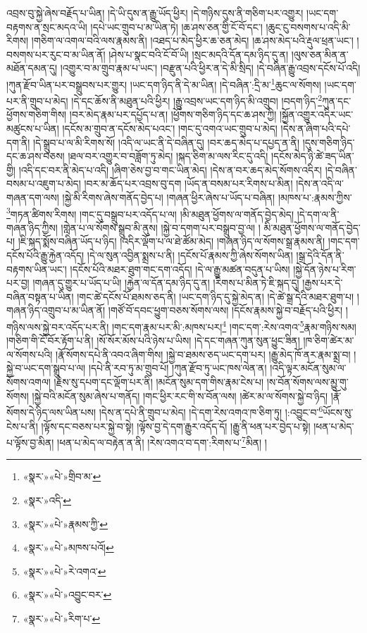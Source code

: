 འབྲས་བུ་སྐྱེ་ཞེས་བརྗོད་པ་ཡིན། །དེ་ཡི་དུས་ན་རྒྱུ་ཡོད་ཕྱིར། །དེ་གཉིས་དུས་ནི་གཅིག་པར་འགྱུར། །ཡང་དག་བརྟགས་ན་སྲང་མདའ་ཡི། །དཔེ་ཡང་གྲུབ་པ་མ་ཡིན་ཏེ། །ཆ་ཤས་ཅན་གྱི་ངོ་བོ་དང་། །ཆུང་ངུ་བསགས་པ་འདི་མི་རིགས། །གཅིག་ལ་འགལ་བའི་ལས་རྣམས་ནི། །འཐད་པ་མེད་ཕྱིར་ཆ་ཅན་མེད། །ཆ་ཤས་མེད་པའི་རྡུལ་ཕྲན་ཡང་། །བསགས་པར་རུང་བ་མ་ཡིན་ནོ། །ཤེས་པ་སྣང་བའི་ངོ་བོ་ཡི། །སྲང་མདའི་དོན་དམ་ཉིད་དུ་ན། །ལུས་ཅན་མིན་ན་མཐོན་དམན་དུ། །འགྱུར་བ་མ་གྲུབ་རྣམ་པ་ཡང་། །བརྫུན་པའི་ཕྱིར་ན་དེ་མི་སྲིད། །དེ་བཞིན་རྒྱུ་འབྲས་དངོས་པོ་འདི། །ཀུན་རྫོབ་ཡིན་པར་བསྒྲུབས་པར་གྱུར། །ཡང་དག་ཉིད་ནི་དེ་མ་ཡིན། །དེ་བཞིན་:དྲི་མ་\footnote{«སྣར་»«པེ་»གྲིབ་མ་}ཆུང་ལ་སོགས། །ཡང་དག་པར་ནི་གྲུབ་པ་མེད། །དེ་དང་ཆོས་ནི་མཐུན་པའི་ཕྱིར། །རྒྱུ་འབྲས་ཡང་དག་ཉིད་མི་འགྲུབ། །བདག་ཉིད་\footnote{«སྣར་»འདི་}ཀུན་དང་ཕྱོགས་གཅིག་གིས། །བར་མེད་རྣམ་པར་དཔྱོད་པ་ན། །ཕྱོགས་གཅིག་ཉིད་དང་ཆ་ཤས་ཀྱི། །སྐྱོན་འགྱུར་འདིར་ཡང་མཚུངས་པ་ཡིན། །དངོས་མ་གྲུབ་ན་དངོས་མེད་པའང་། །གང་དུ་འགའ་ཡང་གྲུབ་པ་མེད། །དེས་ན་ཞིག་པའི་དཔེ་དག་ནི། །དེ་སྒྲུབ་པ་ལ་མི་རིགས་སོ། །འདི་ལ་ཡང་ནི་དེ་བཞིན་དུ། །བར་ཆད་མེད་པ་དཔྱད་ན་ནི། །དུས་གཅིག་ཉིད་དང་ཆ་ཤས་བཅས། །ཐལ་བར་འགྱུར་བ་བཟློག་ཏུ་མེད། །སྐད་ཅིག་མ་ལས་རིང་དུ་འདི། །དངོས་མེད་ཉི་ཚེ་ཟད་ཡིན་གྱི། །འདི་དང་བར་ནི་མེད་པ་འདི། །ཞིག་ཅེས་བྱ་བ་གང་ཡིན་མེད། །དེས་ན་བར་ཆད་མེད་སོགས་འདིར། །དེ་བཞིན་བསམ་པ་འཇུག་པ་མེད། །བར་མ་ཆོད་པར་འབྲས་བུ་དག །ཡོད་ན་བསམ་པར་རིགས་པ་མིན། །དེས་ན་འདི་ལ་གཞན་དག་ལས། །སྐྱེ་མི་རིགས་ཞེས་གནོད་བྱེད་པ། །གཞན་ཕྱིར་ཞེས་པ་ཡོད་པ་བཞིན། །མཁས་པ་:རྣམས་ཀྱིས་\footnote{«སྣར་»«པེ་»རྣམས་ཀྱི་}གཏན་ཚིགས་རིགས། །གང་དུ་བསྒྲུབ་པར་འདོད་པ་ལ། །མི་མཐུན་ཕྱོགས་ལ་གནོད་བྱེད་མེད། །དེ་དག་ལ་ནི་གཞན་ཉིད་ཀྱིས། །གླེན་པ་ལ་སོགས་སྒྲུབ་མི་ནུས། །སྐྱེ་བ་དགག་པར་བསྒྲུབ་བྱ་ལ། །
མི་མཐུན་ཕྱོགས་ལ་གནོད་བྱེད་པ། །ཇི་སྐད་སྨོས་བཞིན་ཡོད་པ་ཉིད། །འདིར་ལྡོག་པ་ལ་ཐེ་ཚོམ་མེད། །གཞན་ཉིད་ལ་སོགས་སྒྲ་རྣམས་ནི། །གང་དག་དངོས་པོའི་རྒྱུ་རྐྱེན་འདོད། །དེ་ལ་སུན་འབྱིན་སྨྲས་པ་ནི། །དངོས་པོ་རྣམས་ཀྱི་ཞེས་སོགས་ཡིན། །སྒྲ་དེའི་དོན་ནི་བརྟགས་ཡིན་ཡང་། །དངོས་པོའི་མཐར་ཐུག་གང་དག་འདོད། །དེ་ལ་རྒྱུ་མཚན་བདུན་པ་ཡིས། །སྐྱེ་དོན་ཉེས་པ་རིག་པར་བྱ། །གཞན་དུ་གྱུར་པ་ཡོད་པ་ཡི། །རྐྱེན་ལ་དོན་དམ་ཉིད་དུ་ན། །རིགས་པ་མིན་ཏེ་ཇི་སྐད་དུ། །རྒྱས་པར་དེ་བཞིན་བསྟན་པ་ཡིན། །གང་ཚེ་དངོས་པོ་ཐམས་ཅད་ནི། །ཡང་དག་ཉིད་དུ་སྐྱེ་མེད་ན། །དེ་ཚེ་སྒྲ་དེའི་མཐར་ཐུག་པ། །གཞན་ཉིད་འགྲུབ་པ་མ་ཡིན་ནོ། །གཙོ་བོ་དབང་ཕྱུག་བཅས་སོགས་ལས། །དངོས་རྣམས་སྐྱེ་བ་བརྗོད་པའི་ཕྱིར། །གཉིས་ལས་སྐྱེ་བར་འདོད་པར་ནི། །གང་དག་རྣམ་པར་མི་:མཁས་པར།\footnote{«སྣར་»«པེ་»མཁས་པའོ།} །གང་དག་:རེས་འགའ་\footnote{«སྣར་»«པེ་»རེ་འགའ་}རྣམ་གཉིས་སམ། །གཅིག་གི་ངོ་བོར་རྟོག་པ་ནི། །སོ་སོར་མོས་པའི་ཉེས་པ་ཡིས། །དེ་དང་གཞན་ཀུན་སུན་ཕྱུང་ཟིན། །ཁ་ཅིག་ཚེར་མ་ལ་སོགས་པའི། །རྣོ་སོགས་དཔེ་ནི་འབའ་ཞིག་གིས། །སྐྱེ་བ་ཐམས་ཅད་ཡང་དག་པར། །རྒྱུ་མེད་ཁོ་ནར་རྣམ་སྨྲ་བ། །སྐྱེ་བ་ཡང་དག་སྒྲུབ་པ་ལ། །དཔེ་ནི་རབ་ཏུ་མ་གྲུབ་པོ། །ཀུན་རྫོབ་ཏུ་ཡང་ཁས་ལེན་ན། །འདི་ལྟར་མངོན་སུམ་ལ་སོགས་འགལ། །རྗེས་སུ་དཔག་དང་ལྡོག་པར་ནི། །མངོན་སུམ་དག་གིས་རྣམ་ངེས་པ། །ས་བོན་སོགས་ལས་མྱུ་གུ་སོགས། །སྐྱེ་བའི་མངོན་སུམ་ཞེས་པ་གནོད། །གང་ཕྱིར་རང་གི་ས་བོན་ལས། །ཚེར་མ་ལ་སོགས་སྐྱེ་བ་ཉིད། །རྣོ་སོགས་དེ་ཉིད་ལས་ཡིན་པས། །དེས་ན་དཔེ་ནི་གྲུབ་པ་མེད། །དེ་དག་རེས་འགའ་ཁ་ཅིག་ཏུ། །:འབྱུང་བ་\footnote{«སྣར་»«པེ་»འབྱུང་བར་}ཡོངས་སུ་ངེས་པ་ནི། །ལྟོས་དང་བཅས་པར་སྐྱེ་བ་སྟེ། །ལྟོས་བྱ་དེ་དག་རྒྱུར་འདོད་དོ། །རྒྱུ་ནི་ཕན་པར་བྱེད་པ་སྟེ། །ཕན་པ་མེད་པ་ལྟོས་བྱ་མིན། །ཕན་པ་མེད་ལ་བརྟེན་ན་ནི། །རེས་འགའ་བ་དག་:རིགས་པ་\footnote{«སྣར་»«པེ་»རིག་པ་}མིན། །
